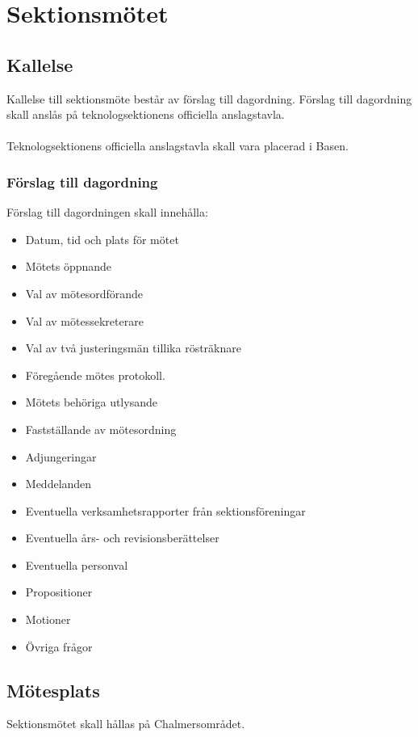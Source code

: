 \documentclass[a4paper, 10pt]{article}
\begin{document}
\newpage
\setcounter{tocdepth}{1}
\tableofcontents
\newpage

\section{Sektionsmötet}

\subsection{Kallelse} 
Kallelse till sektionsmöte består av förslag till dagordning. Förslag till dagordning skall anslås på teknologsektionens officiella anslagstavla. \\\\
Teknologsektionens officiella anslagstavla skall vara placerad i Basen. 
\subsubsection{Förslag till dagordning}
Förslag till dagordningen skall innehålla:
\begin{itemize}  
  \item Datum, tid och plats för mötet 
  \item Mötets öppnande 
  \item Val av mötesordförande 
  \item Val av mötessekreterare 
  \item Val av två justeringsmän tillika rösträknare 
  \item Föregående mötes protokoll. 
  \item Mötets behöriga utlysande 
  \item Fastställande av mötesordning 
  \item Adjungeringar 
  \item Meddelanden 
  \item Eventuella verksamhetsrapporter från sektionsföreningar 
  \item Eventuella års- och revisionsberättelser 
  \item Eventuella personval 
  \item Propositioner 
  \item Motioner 
  \item Övriga frågor 
\end{itemize}
\subsection{Mötesplats} 
Sektionsmötet skall hållas på Chalmersområdet. 
\end{document}
